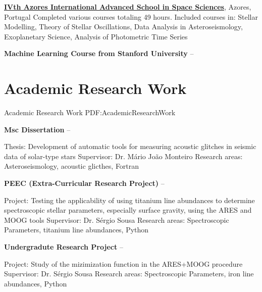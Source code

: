 \documentclass[letterpaper,10pt,oneside]{article}
\begin{document}
\begin{body}
\href{http://www.iastro.pt/research/conferences/faial2016/}
{\textbf{IVth Azores International Advanced School in Space Sciences}},
Azores, Portugal
\hfill
{}
\GapNoBreak
\BulletItem
Completed various courses totaling 49 hours.
\BulletItem
Included courses in: Stellar Modelling, Theory of Stellar Oscillations, Data Analysis in Asteroseismology, Exoplanetary Science, Analysis of Photometric Time Series

\BigGap
{\textbf{Machine Learning Course from Stanford University}}
\hfill
{} --



\section
{Academic Research Work}
{Academic Research Work}
{PDF:AcademicResearchWork}

{\textbf{Msc Dissertation}}
\hfill
{} --
\begin{detail}
\SubBulletItem
Thesis: Development of automatic tools for measuring acoustic glitches in seismic data of solar-type stars
\SubBulletItem
Supervisor:
Dr. Mário João Monteiro
\SubBulletItem
Research areas: Asteroseismology, acoustic glicthes, Fortran
\end{detail}

\GapNoBreak
{\textbf{PEEC (Extra-Curricular Research Project)}}
\hfill
{} --
\begin{detail}
\SubBulletItem
Project:
Testing the applicability of using titanium line abundances to determine spectroscopic stellar parameters, especially surface gravity, using the ARES and MOOG tools
\SubBulletItem
Supervisor:
Dr. Sérgio Sousa
\SubBulletItem
Research areas: Spectroscopic Parameters, titanium line abundances, Python
\end{detail}

\GapNoBreak
{\textbf{Undergradute Research Project}}
\hfill
{} --
\begin{detail}
\SubBulletItem
Project:
Study of the mizimization function in the ARES+MOOG procedure
\SubBulletItem
Supervisor:
Dr. Sérgio Sousa
\SubBulletItem
Research areas: Spectroscopic Parameters, iron line abundances, Python
\end{detail}



\end{body}
\end{document}
